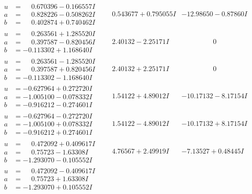 \documentclass[1p]{elsarticle_modified}
\theoremstyle{definition}
\begin{document}
$$\begin{array}{c|c|c}
\begin{aligned}
u &= \phantom{-}0.670396 - 0.166557 I \\
a &= \phantom{-}0.828226 - 0.508262 I \\
b &= \phantom{-}0.402874 + 0.740462 I\end{aligned}
 & \phantom{-}0.543677 + 0.795055 I & -12.98650 - 0.87860 I \\ \hline\begin{aligned}
u &= \phantom{-}0.263561 + 1.285520 I \\
a &= \phantom{-}0.397587 - 0.820456 I \\
b &= -0.113302 + 1.168640 I\end{aligned}
 & \phantom{-}2.40132 - 2.25171 I & \phantom{-0.000000 } 0 \\ \hline\begin{aligned}
u &= \phantom{-}0.263561 - 1.285520 I \\
a &= \phantom{-}0.397587 + 0.820456 I \\
b &= -0.113302 - 1.168640 I\end{aligned}
 & \phantom{-}2.40132 + 2.25171 I & \phantom{-0.000000 } 0 \\ \hline\begin{aligned}
u &= -0.627964 + 0.272720 I \\
a &= -1.005100 - 0.078332 I \\
b &= -0.916212 - 0.274601 I\end{aligned}
 & \phantom{-}1.54122 + 4.89012 I & -10.17132 - 8.17154 I \\ \hline\begin{aligned}
u &= -0.627964 - 0.272720 I \\
a &= -1.005100 + 0.078332 I \\
b &= -0.916212 + 0.274601 I\end{aligned}
 & \phantom{-}1.54122 - 4.89012 I & -10.17132 + 8.17154 I \\ \hline\begin{aligned}
u &= \phantom{-}0.472092 + 0.409617 I \\
a &= \phantom{-}0.75723 - 1.63308 I \\
b &= -1.293070 - 0.105552 I\end{aligned}
 & \phantom{-}4.76567 + 2.49919 I & -7.13527 + 0.48445 I \\ \hline\begin{aligned}
u &= \phantom{-}0.472092 - 0.409617 I \\
a &= \phantom{-}0.75723 + 1.63308 I \\
b &= -1.293070 + 0.105552 I\end{aligned}

\end{array}$$
\end{document}
